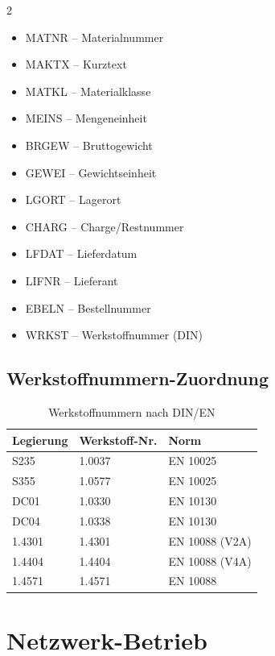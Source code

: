 \documentclass[a4paper,12pt]{article}
\begin{document}
\begin{multicols}{2}
\begin{itemize}[noitemsep]
    \item MATNR -- Materialnummer
    \item MAKTX -- Kurztext
    \item MATKL -- Materialklasse
    \item MEINS -- Mengeneinheit
    \item BRGEW -- Bruttogewicht
    \item GEWEI -- Gewichtseinheit
    \item LGORT -- Lagerort
    \item CHARG -- Charge/Restnummer
    \item LFDAT -- Lieferdatum
    \item LIFNR -- Lieferant
    \item EBELN -- Bestellnummer
    \item WRKST -- Werkstoffnummer (DIN)
\end{itemize}
\end{multicols}

\subsection{Werkstoffnummern-Zuordnung}

\begin{table}[h]
\centering
\begin{tabular}{l l l}
\toprule
\textbf{Legierung} & \textbf{Werkstoff-Nr.} & \textbf{Norm} \\
\midrule
S235 & 1.0037 & EN 10025 \\
S355 & 1.0577 & EN 10025 \\
DC01 & 1.0330 & EN 10130 \\
DC04 & 1.0338 & EN 10130 \\
1.4301 & 1.4301 & EN 10088 (V2A) \\
1.4404 & 1.4404 & EN 10088 (V4A) \\
1.4571 & 1.4571 & EN 10088 \\
\bottomrule
\end{tabular}
\caption{Werkstoffnummern nach DIN/EN}
\end{table}

\section{Netzwerk-Betrieb}
\end{document}
